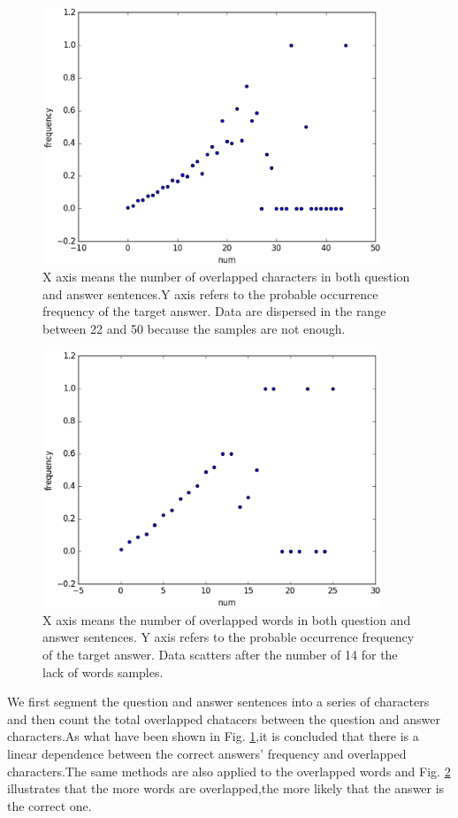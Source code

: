 \documentclass{llncs}
\begin{document}

\begin{figure}[htb]
\centering
\includegraphics[width=4in]{figures/character_overlap.eps}
\caption{X axis means the number of overlapped characters in both question and answer sentences.Y axis refers to the probable occurrence frequency of the target answer. Data are dispersed in the range between 22 and 50 because the samples are not enough.}
\label{fig:character_overlap}
\end{figure}


\begin{figure}
\centering
\includegraphics[width=4in]{figures/word_overlap.eps}
\caption{X axis means the number of overlapped words in both question and answer sentences. Y axis refers to the probable occurrence frequency of the target answer. Data scatters after the number of 14 for the lack of words samples.}
\label{fig:word_overlap}
\end{figure}

We first segment the question and answer sentences into a series of characters and then count the total overlapped chatacers between the question and answer characters.As what have been shown in Fig. \ref{fig:character_overlap},it is concluded that there is a linear dependence between the correct answers’ frequency and overlapped characters.The same methods are also applied to the overlapped words and Fig. \ref{fig:word_overlap} illustrates that the more words are overlapped,the more likely that the answer is the correct one.
\end{document}
